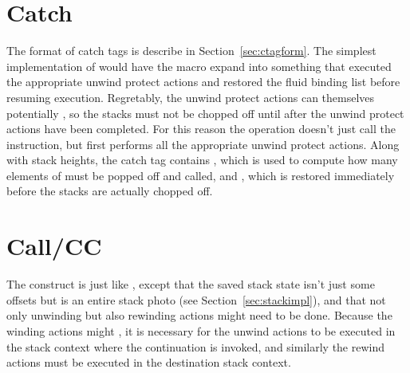 

\section{Catch} \label{sec:oakcatch}

The format of catch tags is describe in Section~\ref{sec:ctagform}.
The simplest implementation of  would have the
 macro expand into something that executed the
appropriate unwind protect actions and restored the fluid binding list
before resuming execution.  Regretably, the unwind protect actions can
themselves potentially , so the stacks must not be chopped
off until after the unwind protect actions have been completed.  For
this reason the  operation doesn't just call the 
instruction, but first performs all the appropriate unwind protect
actions.  Along with stack heights, the catch tag contains
, which is used to compute how many elements of
 must be popped off and called, and
, which is restored immediately before
the stacks are actually chopped off.



\section{Call/CC}

The  construct is just like , except that
the saved stack state isn't just some offsets but is an entire stack
photo (see Section~\ref{sec:stackimpl}), and that not only unwinding
but also rewinding actions might need to be done.  Because the winding
actions might , it is necessary for the unwind actions to be
executed in the stack context where the continuation is invoked, and
similarly the rewind actions must be executed in the destination stack
context.


